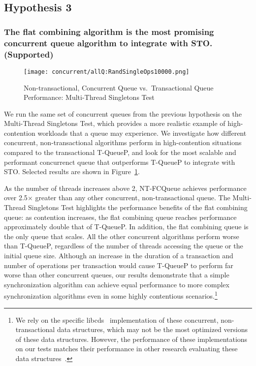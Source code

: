 \subsection{Hypothesis 3}
\subsubsection{The flat combining algorithm is the most promising concurrent queue algorithm to integrate with STO. (Supported)}
\label{eval:hypo3}

\begin{figure}[t!]
    \centering
   	\begin{minipage}{\textwidth}
        {\texttt{[image: concurrent/allQ:RandSingleOps10000.png]}}
	\end{minipage}
    \caption{Non-transactional, Concurrent Queue vs.\ Transactional Queue Performance: Multi-Thread Singletons Test}
    \label{fig:ntqs}
\end{figure}

We run the same set of concurrent queues from the previous hypothesis on the Multi-Thread Singletons Test, which provides a more realistic example of high-contention workloads that a queue may experience. We investigate how different concurrent, non-transactional algorithms perform in high-contention situations compared to the transactional T-QueueP, and look for the most scalable and performant concurrenct queue that outperforms T-QueueP to integrate with STO. Selected results are shown in Figure~\ref{fig:ntqs}.

As the number of threads increases above 2, NT-FCQueue achieves performance over 2.5$\times$ greater than any other concurrent, non-transactional queue. The Multi-Thread Singletons Test highlights the performance benefits of the flat combining queue: as contention increases, the flat combining queue reaches performance approximately double that of T-QueueP. In addition, the flat combining queue is the only queue that scales. All the other concurrent algorithms perform worse than T-QueueP, regardless of the number of threads accessing the queue or the initial queue size. 
Although an increase in the duration of a transaction and number of operations per transaction would cause T-QueueP to perform far worse than other concurrent queues, our results demonstrate that a simple synchronization algorithm can achieve equal performance to more complex synchronization algorithms even in some highly contentious scenarios.\footnote{We rely on the specific libcds~\cite{libcds} implementation of these concurrent, non-transactional data structures, which may not be the most optimized versions of these data structures. However, the performance of these implementations on our tests matches their performance in other research evaluating these data structures~\cite{queue1, queue3}.}

